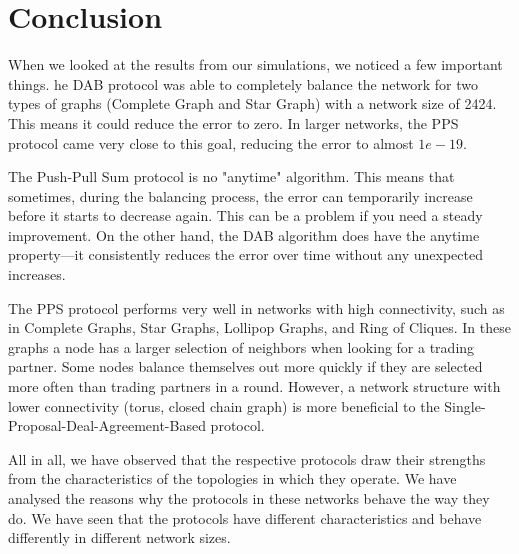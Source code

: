 \chapter{Conclusion}\label{chap:conclusion}
When we looked at the results from our simulations, we noticed a few important things. he DAB protocol was able to completely balance the network for two types of graphs (Complete Graph and Star Graph) with a network size of 2424. This means it could reduce the error to zero. In larger networks, the PPS protocol came very close to this goal, reducing the error to almost $1e-19$.  

The Push-Pull Sum protocol is no "anytime" algorithm. This means that sometimes, during the balancing process, the error can temporarily increase before it starts to decrease again. This can be a problem if you need a steady improvement. On the other hand, the DAB algorithm does have the anytime property—it consistently reduces the error over time without any unexpected increases.

The PPS protocol performs very well in networks with high connectivity, such as in Complete Graphs, Star Graphs, Lollipop Graphs, and Ring of Cliques. In these graphs a node has a larger selection of neighbors when looking for a trading partner. Some nodes balance themselves out more quickly if they are selected more often than trading partners in a round. However, a network structure with lower connectivity (torus, closed chain graph) is more beneficial to the Single-Proposal-Deal-Agreement-Based protocol.

All in all, we have observed that the respective protocols draw their strengths from the characteristics of the topologies in which they operate. We have analysed the reasons why the protocols in these networks behave the way they do. We have seen that the protocols have different characteristics and behave differently in different network sizes.